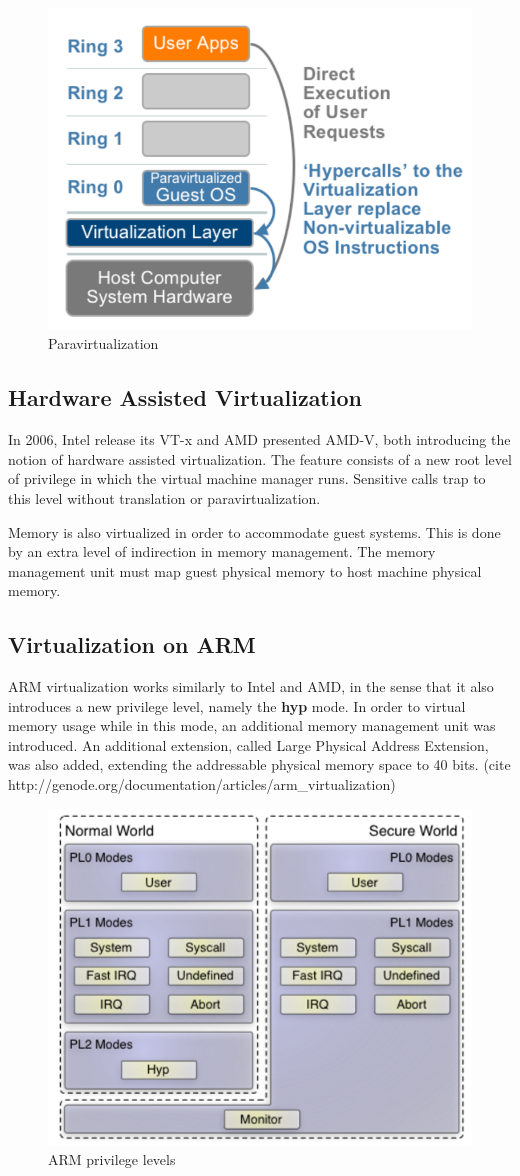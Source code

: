 \begin{figure}[h]
\centering
  \includegraphics[width=.4\linewidth]{img/paravirt.png}
  \caption{Paravirtualization}
\end{figure}

\subsection{Hardware Assisted Virtualization}
\label{subsec:havirt}

In 2006, Intel release its VT-x and AMD presented AMD-V, both introducing the notion of hardware assisted virtualization. The feature consists of a new root level of privilege in which the virtual machine manager runs. Sensitive calls trap to this level without  translation or paravirtualization.

Memory is also virtualized in order to accommodate guest systems. This is done by an extra level of indirection in memory management. The memory management unit must map guest physical memory to host machine physical memory.

\subsection{Virtualization on ARM}
\label{subsec:armvirt}

ARM virtualization works similarly to Intel and AMD, in the sense that it also introduces a new privilege level, namely the \textbf{hyp} mode. In order to virtual memory usage while in this mode, an additional memory management unit was introduced. An additional extension, called Large Physical Address Extension, was also added, extending the addressable physical memory space to 40 bits.
(cite http://genode.org/documentation/articles/arm_virtualization)

\begin{figure}[h]
\centering
  \includegraphics[width=.5\linewidth]{img/arm.png}
  \caption{ARM privilege levels}
\end{figure}

